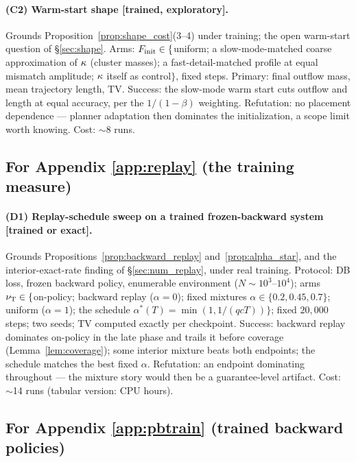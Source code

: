 \paragraph{(C2) Warm-start shape [trained, exploratory].}
Grounds Proposition~\ref{prop:shape_cost}(3--4) under training; the open warm-start
question of \S\ref{sec:shape}. Arms: $F_{\mathrm{init}}\in\{$uniform; a slow-mode-matched coarse
approximation of $\kappa$ (cluster masses); a fast-detail-matched profile at equal
mismatch amplitude; $\kappa$ itself as control$\}$, fixed steps. Primary: final outflow
mass, mean trajectory length, TV. Success: the slow-mode warm start cuts outflow and
length at equal accuracy, per the $1/(1-\beta)$ weighting. Refutation: no placement
dependence --- planner adaptation then dominates the initialization, a scope limit worth
knowing. Cost: $\sim$8 runs.

\subsection{For Appendix \ref{app:replay} (the training measure)}

\paragraph{(D1) Replay-schedule sweep on a trained frozen-backward system [trained or
exact].}
Grounds Propositions~\ref{prop:backward_replay} and~\ref{prop:alpha_star}, and the
interior-exact-rate finding of \S\ref{sec:num_replay}, under real training. Protocol: DB
loss, frozen backward policy, enumerable environment ($N\sim10^3$--$10^4$); arms
$\nu_{\mathrm{T}}\in\{$on-policy; backward replay ($\alpha=0$); fixed mixtures
$\alpha\in\{0.2, 0.45, 0.7\}$; uniform ($\alpha=1$); the schedule
$\alpha^*(T)=\min(1,1/(qcT))\}$; fixed $20{,}000$ steps; two seeds; TV computed exactly
per checkpoint. Success: backward replay dominates on-policy in the late phase and
trails it before coverage (Lemma~\ref{lem:coverage}); some interior mixture beats both
endpoints; the schedule matches the best fixed $\alpha$. Refutation: an endpoint
dominating throughout --- the mixture story would then be a guarantee-level artifact.
Cost: $\sim$14 runs (tabular version: CPU hours).

\subsection{For Appendix \ref{app:pbtrain} (trained backward policies)}

